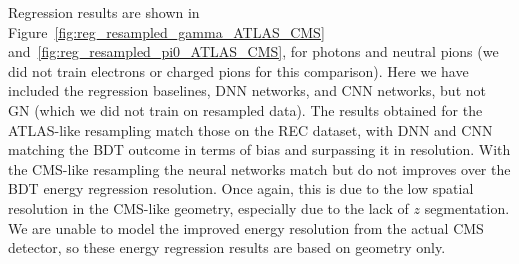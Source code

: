 Regression results are shown in Figure~\ref{fig:reg_resampled_gamma_ATLAS_CMS} and~\ref{fig:reg_resampled_pi0_ATLAS_CMS}, for photons and neutral pions (we did not train electrons or charged pions for this comparison). Here we have included the regression baselines, DNN networks, and CNN networks, but not GN (which we did not train on resampled data). The results obtained for the ATLAS-like resampling match those on the REC dataset, with DNN and CNN matching the BDT outcome in terms of bias and surpassing it in resolution. With the CMS-like resampling the neural networks match but do not improves over the BDT energy regression resolution. Once again, this is due to the low spatial resolution in the CMS-like geometry, especially due to the lack of $z$ segmentation. We are unable to model the improved energy resolution from the actual CMS detector, so these energy regression results are based on geometry only.


